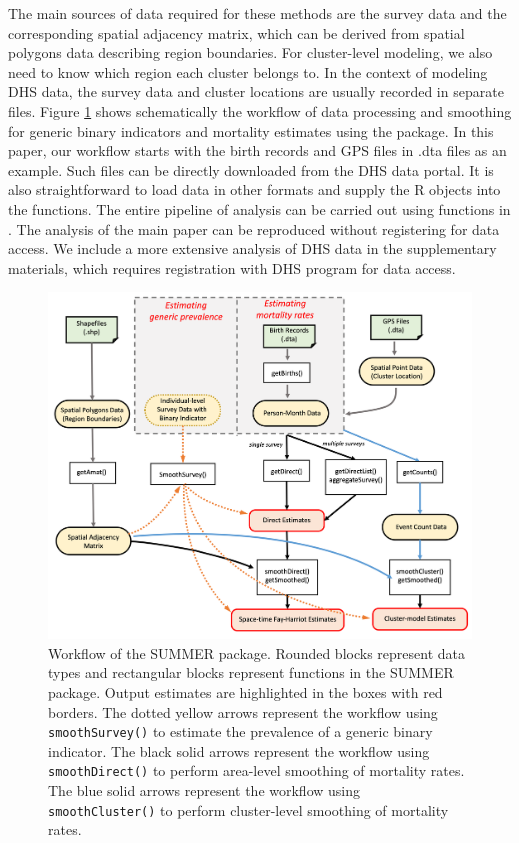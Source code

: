 The main sources of data required for these methods are the survey data and the corresponding spatial adjacency matrix, which can be derived from spatial polygons data describing region boundaries. For cluster-level modeling, we also need to know which region each cluster belongs to. In the context of modeling DHS data, the survey data and cluster locations are usually recorded in separate files. Figure \ref{fig:workflow} shows schematically the workflow of data processing and smoothing for generic binary indicators and mortality estimates using the  package. In this paper, our workflow starts with the birth records and GPS files in .dta files as an example. Such files can be directly downloaded from the DHS data portal. It is also straightforward to load data in other formats and supply the R objects into the functions. The entire pipeline of analysis can be carried out using functions in . The analysis of the main paper can be reproduced without registering for data access. We include a more extensive analysis of DHS data in the supplementary materials, which requires registration with DHS program for data access.

\begin{figure}[!ht]
\includegraphics[width=1\linewidth,]{Figures/Workflow} \caption{Workflow of the SUMMER package. Rounded blocks represent data types and rectangular blocks represent functions in the SUMMER package. Output estimates are highlighted in the boxes with red borders. The dotted yellow arrows represent the workflow using \texttt{smoothSurvey()} to estimate the prevalence of a generic binary indicator. The black solid arrows represent the workflow using \texttt{smoothDirect()} to perform area-level smoothing of mortality rates. The blue solid arrows represent the workflow using \texttt{smoothCluster()} to perform cluster-level smoothing of mortality rates.}\label{fig:workflow}
\end{figure}

